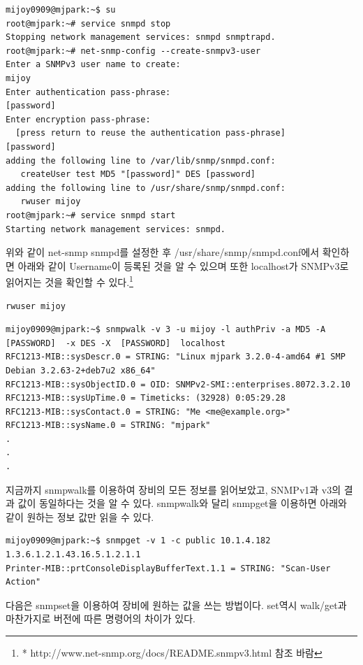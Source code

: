 \documentclass[11pt
  , a4paper
  , article
  , oneside
]{memoir}
\begin{document}
\begin{lstlisting}[style=termstyle]
mijoy0909@mjpark:~$ su                                     
root@mjpark:~# service snmpd stop
Stopping network management services: snmpd snmptrapd.
root@mjpark:~# net-snmp-config --create-snmpv3-user
Enter a SNMPv3 user name to create: 
mijoy
Enter authentication pass-phrase: 
[password]
Enter encryption pass-phrase: 
  [press return to reuse the authentication pass-phrase]
[password]
adding the following line to /var/lib/snmp/snmpd.conf:
   createUser test MD5 "[password]" DES [password]
adding the following line to /usr/share/snmp/snmpd.conf:
   rwuser mijoy
root@mjpark:~# service snmpd start
Starting network management services: snmpd.
\end{lstlisting}

위와 같이 net-snmp snmpd를 설정한 후 /usr/share/snmp/snmpd.conf에서 확인하면 아래와 같이 Username이 등록된 것을 알 수 있으며 또한 localhost가 SNMPv3로 읽어지는 것을 확인할 수 있다.\footnote{* http://www.net-snmp.org/docs/README.snmpv3.html 참조 바람}

\begin{lstlisting}[style=termstyle]
rwuser mijoy
\end{lstlisting}

\begin{lstlisting}[style=termstyle]
mijoy0909@mjpark:~$ snmpwalk -v 3 -u mijoy -l authPriv -a MD5 -A  [PASSWORD]  -x DES -X  [PASSWORD]  localhost
RFC1213-MIB::sysDescr.0 = STRING: "Linux mjpark 3.2.0-4-amd64 #1 SMP Debian 3.2.63-2+deb7u2 x86_64"
RFC1213-MIB::sysObjectID.0 = OID: SNMPv2-SMI::enterprises.8072.3.2.10
RFC1213-MIB::sysUpTime.0 = Timeticks: (32928) 0:05:29.28
RFC1213-MIB::sysContact.0 = STRING: "Me <me@example.org>"
RFC1213-MIB::sysName.0 = STRING: "mjpark"
.
.
.
\end{lstlisting}

지금까지 snmpwalk를 이용하여 장비의 모든 정보를 읽어보았고, SNMPv1과 v3의 결과 값이 동일하다는 것을 알 수 있다. snmpwalk와 달리 snmpget을 이용하면 아래와 같이 원하는 정보 값만 읽을 수 있다.
\begin{lstlisting}[style=termstyle]
mijoy0909@mjpark:~$ snmpget -v 1 -c public 10.1.4.182 1.3.6.1.2.1.43.16.5.1.2.1.1
Printer-MIB::prtConsoleDisplayBufferText.1.1 = STRING: "Scan-User Action"
\end{lstlisting}

다음은 snmpset을 이용하여 장비에 원하는 값을 쓰는 방법이다. set역시 walk/get과 마찬가지로 버전에 따른 명령어의 차이가 있다.
\end{document}

